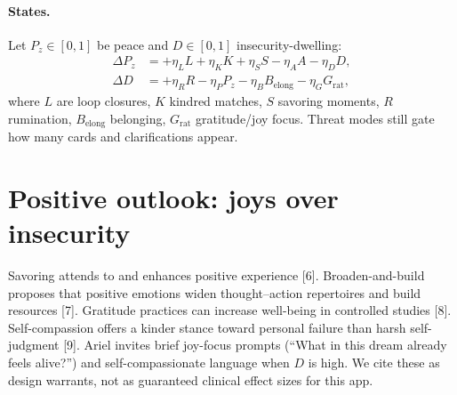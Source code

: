 \documentclass[11pt, a4paper]{article}
\begin{document}
\paragraph{States.}
Let $P_z\in[0,1]$ be peace and $D\in[0,1]$ insecurity-dwelling:
\begin{align}
\Delta P_z &= +\eta_L L + \eta_K K + \eta_S S - \eta_A A - \eta_D D,\\
\Delta D &= +\eta_R R - \eta_P P_z - \eta_B B_{\mathrm{elong}} - \eta_G G_{\mathrm{rat}},
\end{align}
where $L$ are loop closures, $K$ kindred matches, $S$ savoring moments, $R$ rumination, $B_{\mathrm{elong}}$ belonging, $G_{\mathrm{rat}}$ gratitude/joy focus. Threat modes still gate how many cards and clarifications appear.

\section{Positive outlook: joys over insecurity}
Savoring attends to and enhances positive experience [6]. Broaden-and-build proposes that positive emotions widen thought--action repertoires and build resources [7]. Gratitude practices can increase well-being in controlled studies [8]. Self-compassion offers a kinder stance toward personal failure than harsh self-judgment [9]. Ariel invites brief joy-focus prompts (``What in this dream already feels alive?'') and self-compassionate language when $D$ is high. We cite these as design warrants, not as guaranteed clinical effect sizes for this app.
\end{document}
